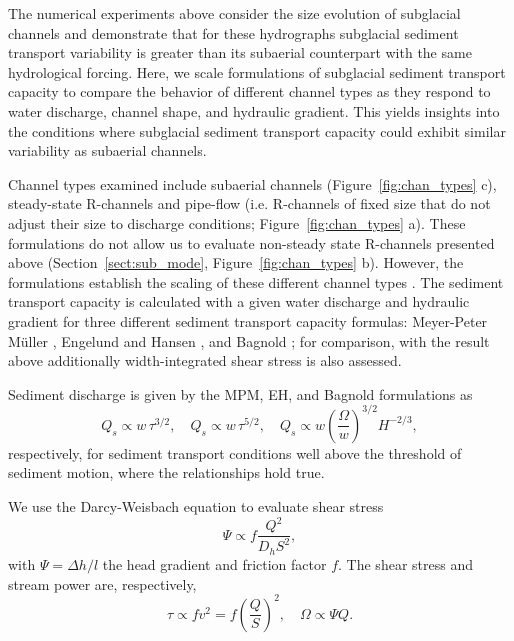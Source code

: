 \documentclass[tc, manuscript]{copernicus}
\begin{document}
The numerical experiments above consider the size evolution of subglacial channels and demonstrate that for these hydrographs subglacial sediment transport variability is greater than its subaerial counterpart with the same hydrological forcing. 
Here, we scale formulations of subglacial sediment transport capacity to compare the behavior of different channel types as they respond to water discharge, channel shape, and hydraulic gradient. 
This yields insights into the conditions where subglacial sediment transport capacity could exhibit similar variability as subaerial channels.

Channel types examined include subaerial channels (Figure~\ref{fig:chan_types} c), steady-state R-channels \citep[Figure~\ref{fig:chan_types} d]{rothlisberger1972} and pipe-flow (i.e. R-channels of fixed size that do not adjust their size to discharge conditions; Figure~\ref{fig:chan_types} a).
These formulations do not allow us to evaluate non-steady state R-channels presented above (Section~\ref{sect:sub_mode}, Figure~\ref{fig:chan_types} b).
However, the formulations establish the scaling of these different channel types  .
The sediment transport capacity is calculated with a given water discharge and hydraulic gradient for three different sediment transport capacity formulas: Meyer-Peter M\"uller  \citep[MPM; ][]{meyer1948}, Engelund and Hansen \citep[EH; ][]{engelund1967}, and Bagnold \citep{bagnold1980}; for comparison, with the result above additionally width-integrated shear stress is also assessed.

Sediment discharge is given by the MPM, EH, and Bagnold formulations as
\begin{equation}
  \label{eq:Qs_eq}
  Q_s \propto w\, \tau^{3/2}, \quad Q_s \propto w\, \tau^{5/2}, \quad Q_s \propto w \left(\frac{\Omega}{w}\right)^{3/2} H^{-2/3},
\end{equation}
respectively, for sediment transport conditions well above the threshold of sediment motion, where the relationships hold true.

We use the Darcy-Weisbach equation to evaluate shear stress
\begin{equation}
  \label{eq:DW}
  \Psi \propto f\frac{Q^2}{D_h S^2},
\end{equation}
with $\Psi = \Delta h / l$ the head gradient and friction factor $f$.
The shear stress and stream power are, respectively,
\begin{equation}
  \label{eq:tau-omega}
  \tau \propto f v^2 = f \left(\frac{Q}{S}\right)^2, \quad  \Omega \propto \Psi Q.
\end{equation}
% 
\end{document}
